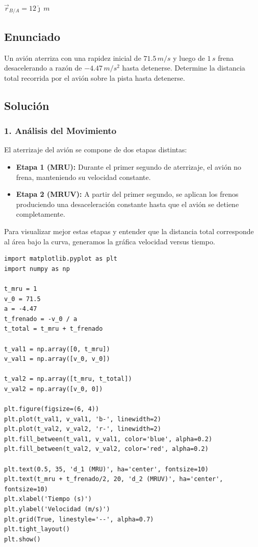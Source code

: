 \documentclass[12pt, a4paper]{article}
\begin{document}
\begin{tcolorbox}[colback=blue!5!white, colframe=blue!75!black, title=Respuesta Final]
    \centering
    \Large $\vec{r}_{B/A} = 12\hat{\jmath} \, \si{m}$
\end{tcolorbox}

\newpage

\subsection*{Enunciado}
Un avión aterriza con una rapidez inicial de $71.5 \, \si{m/s}$ y luego de $1 \, \si{s}$ frena desacelerando a razón de $-4.47 \, \si{m/s^2}$ hasta detenerse. Determine la distancia total recorrida por el avión sobre la pista hasta detenerse.

\subsection*{Solución}

\subsubsection*{1. Análisis del Movimiento}
El aterrizaje del avión se compone de dos etapas distintas:
\begin{itemize}
\item \textbf{Etapa 1 (MRU):} Durante el primer segundo de aterrizaje, el avión no frena, manteniendo su velocidad constante.
\item \textbf{Etapa 2 (MRUV):} A partir del primer segundo, se aplican los frenos produciendo una desaceleración constante hasta que el avión se detiene completamente.
\end{itemize}

Para visualizar mejor estas etapas y entender que la distancia total corresponde al área bajo la curva, generamos la gráfica velocidad versus tiempo.

\begin{lstlisting}
import matplotlib.pyplot as plt
import numpy as np

t_mru = 1
v_0 = 71.5
a = -4.47
t_frenado = -v_0 / a
t_total = t_mru + t_frenado

t_val1 = np.array([0, t_mru])
v_val1 = np.array([v_0, v_0])

t_val2 = np.array([t_mru, t_total])
v_val2 = np.array([v_0, 0])

plt.figure(figsize=(6, 4))
plt.plot(t_val1, v_val1, 'b-', linewidth=2)
plt.plot(t_val2, v_val2, 'r-', linewidth=2)
plt.fill_between(t_val1, v_val1, color='blue', alpha=0.2)
plt.fill_between(t_val2, v_val2, color='red', alpha=0.2)

plt.text(0.5, 35, 'd_1 (MRU)', ha='center', fontsize=10)
plt.text(t_mru + t_frenado/2, 20, 'd_2 (MRUV)', ha='center', fontsize=10)
plt.xlabel('Tiempo (s)')
plt.ylabel('Velocidad (m/s)')
plt.grid(True, linestyle='--', alpha=0.7)
plt.tight_layout()
plt.show()
\end{lstlisting}
\end{document}
